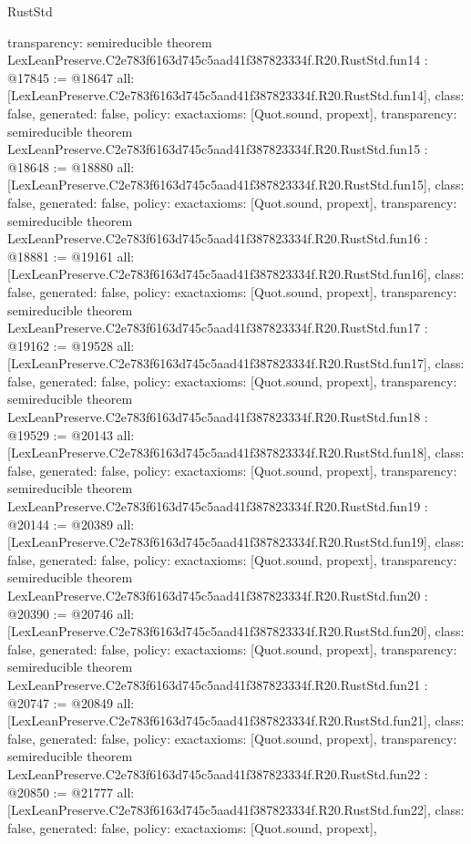 \begin{lexlean}{RustStd}
\begin{coremodule}
{  transparency: semireducible
}
theorem LexLeanPreserve.C2e783f6163d745c5aad41f387823334f.R20.RustStd.fun14 : @17845 := @18647 {
  all: [LexLeanPreserve.C2e783f6163d745c5aad41f387823334f.R20.RustStd.fun14],
  class: false,
  generated: false,
  policy: exact{axioms: [Quot.sound, propext]},
  transparency: semireducible
}
theorem LexLeanPreserve.C2e783f6163d745c5aad41f387823334f.R20.RustStd.fun15 : @18648 := @18880 {
  all: [LexLeanPreserve.C2e783f6163d745c5aad41f387823334f.R20.RustStd.fun15],
  class: false,
  generated: false,
  policy: exact{axioms: [Quot.sound, propext]},
  transparency: semireducible
}
theorem LexLeanPreserve.C2e783f6163d745c5aad41f387823334f.R20.RustStd.fun16 : @18881 := @19161 {
  all: [LexLeanPreserve.C2e783f6163d745c5aad41f387823334f.R20.RustStd.fun16],
  class: false,
  generated: false,
  policy: exact{axioms: [Quot.sound, propext]},
  transparency: semireducible
}
theorem LexLeanPreserve.C2e783f6163d745c5aad41f387823334f.R20.RustStd.fun17 : @19162 := @19528 {
  all: [LexLeanPreserve.C2e783f6163d745c5aad41f387823334f.R20.RustStd.fun17],
  class: false,
  generated: false,
  policy: exact{axioms: [Quot.sound, propext]},
  transparency: semireducible
}
theorem LexLeanPreserve.C2e783f6163d745c5aad41f387823334f.R20.RustStd.fun18 : @19529 := @20143 {
  all: [LexLeanPreserve.C2e783f6163d745c5aad41f387823334f.R20.RustStd.fun18],
  class: false,
  generated: false,
  policy: exact{axioms: [Quot.sound, propext]},
  transparency: semireducible
}
theorem LexLeanPreserve.C2e783f6163d745c5aad41f387823334f.R20.RustStd.fun19 : @20144 := @20389 {
  all: [LexLeanPreserve.C2e783f6163d745c5aad41f387823334f.R20.RustStd.fun19],
  class: false,
  generated: false,
  policy: exact{axioms: [Quot.sound, propext]},
  transparency: semireducible
}
theorem LexLeanPreserve.C2e783f6163d745c5aad41f387823334f.R20.RustStd.fun20 : @20390 := @20746 {
  all: [LexLeanPreserve.C2e783f6163d745c5aad41f387823334f.R20.RustStd.fun20],
  class: false,
  generated: false,
  policy: exact{axioms: [Quot.sound, propext]},
  transparency: semireducible
}
theorem LexLeanPreserve.C2e783f6163d745c5aad41f387823334f.R20.RustStd.fun21 : @20747 := @20849 {
  all: [LexLeanPreserve.C2e783f6163d745c5aad41f387823334f.R20.RustStd.fun21],
  class: false,
  generated: false,
  policy: exact{axioms: [Quot.sound, propext]},
  transparency: semireducible
}
theorem LexLeanPreserve.C2e783f6163d745c5aad41f387823334f.R20.RustStd.fun22 : @20850 := @21777 {
  all: [LexLeanPreserve.C2e783f6163d745c5aad41f387823334f.R20.RustStd.fun22],
  class: false,
  generated: false,
  policy: exact{axioms: [Quot.sound, propext]},
}
\end{coremodule}
\end{lexlean}
